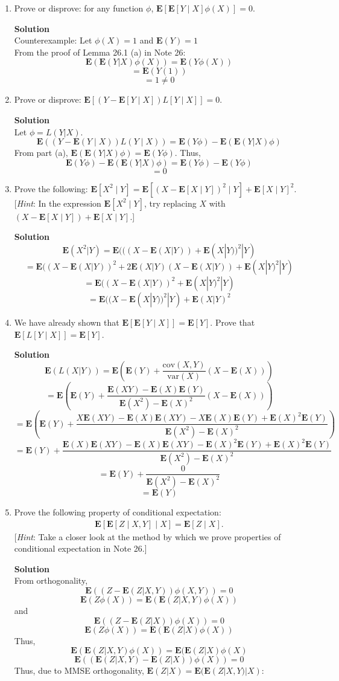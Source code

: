 \documentclass[11pt]{article}
\newenvironment{Parts}{\begin{enumerate}[label=(\alph*)]}{\end{enumerate}}
\newcommand*{\Part}{\item}
\newenvironment{Answer}{\vspace{10pt}\begin{mdframed}\textbf{Solution}\\}{\end{mdframed}\vfill\pagebreak[3]}
\newenvironment{Answer}{\vspace{10pt}}{\vfill\pagebreak[3]}
\newcommand*{\E}{\textbf{E}}
\newcommand*{\var}[1]{\text{var}(#1)}
\newcommand*{\cov}[1]{\text{cov}(#1)}
\begin{document}
\begin{Parts}
  \Part Prove or disprove: for any function $\phi$, $\E[\E[Y \mid X] \phi(X)] = 0$.
  \begin{Answer}
        Counterexample: Let $\phi(X)=1$ and $\E(Y)=1$ \\
        From the proof of Lemma 26.1 (a) in Note 26:
        $$\E(\E(Y|X)\phi(X))=\E(Y\phi(X))$$
        $$=\E(Y(1))$$
        $$=1\not = 0$$
  \end{Answer}

  \Part Prove or disprove: $\E[(Y - \E[Y \mid X]) L[Y \mid X]] = 0$.
  \begin{Answer}
    Let $\phi=L(Y|X)$.
    $$\E((Y - \E(Y \mid X)) L(Y \mid X)) = \E(Y\phi)-\E(\E(Y|X)\phi)$$
    From part (a), $\E(\E(Y|X)\phi)=\E(Y\phi)$. Thus,
    $$\E(Y\phi)-\E(\E(Y|X)\phi)=\E(Y\phi)-\E(Y\phi)$$
    $$=0$$
  \end{Answer}
  
  \Part Prove the following: $\E[X^2 \mid Y] = \E[(X - \E[X \mid Y])^2 \mid Y] + \E[X \mid Y]^2$. [\textit{Hint}: In the expression $\E[X^2 \mid Y]$, try replacing $X$ with $(X - \E[X \mid Y]) + \E[X \mid Y]$.]
  \begin{Answer}
    $$\E(X^2|Y)=\E(((X-\E(X|Y))+\E(X|Y))^2|Y)$$
    $$=\E((X-\E(X|Y))^2+2\E(X|Y)(X-\E(X|Y))+\E(X|Y)^2|Y)$$
    $$=\E((X-\E(X|Y))^2+\E(X|Y)^2|Y)$$
    $$=\E((X-\E(X|Y))^2|Y)+\E(X|Y)^2$$
  \end{Answer}
  
  \Part We have already shown that $\E[\E[Y \mid X]] = \E[Y]$. Prove that $\E[L[Y \mid X]] = \E[Y]$.
  \begin{Answer}
    $$\E(L(X|Y))=\E(\E(Y)+\frac{\cov{X,Y}}{\var{X}}(X-\E(X)))$$
    $$=\E(\E(Y)+\frac{\E(XY)-\E(X)\E(Y)}{\E(X^2)-\E(X)^2}(X-\E(X)))$$
    $$=\E(\E(Y)+\frac{X\E(XY)-\E(X)\E(XY)-X\E(X)\E(Y)+\E(X)^2\E(Y)}{\E(X^2)-\E(X)^2})$$
    $$=\E(Y)+\frac{\E(X)\E(XY)-\E(X)\E(XY)-\E(X)^2\E(Y)+\E(X)^2\E(Y)}{\E(X^2)-\E(X)^2}$$
    $$=\E(Y)+\frac{0}{\E(X^2)-\E(X)^2}$$
    $$=\E(Y)$$
  \end{Answer}

  \Part Prove the following property of conditional expectation:
  \begin{align*}
      \E[ \E[Z \mid X, Y] \mid X ] = \E[Z \mid X].
  \end{align*}
  [\textit{Hint}: Take a closer look at the method by which we prove properties of conditional expectation in Note 26.]
  \begin{Answer}
  From orthogonality,
    $$\E((Z-\E(Z|X,Y))\phi(X,Y))=0$$
    $$\E(Z\phi(X))=\E(\E(Z|X,Y)\phi(X))$$
    and
    $$\E((Z-\E(Z|X))\phi(X))=0$$
    $$\E(Z\phi(X))=\E(\E(Z|X)\phi(X))$$
    Thus,
    $$\E(\E(Z|X,Y)\phi(X))=\E(\E(Z|X)\phi(X)$$
    $$\E((\E(Z|X,Y)-\E(Z|X))\phi(X))=0$$
    Thus, due to MMSE orthogonality, $\E(Z|X)=\E(\E(Z|X,Y)|X)$:
  \end{Answer}
\end{Parts}
\end{document}
